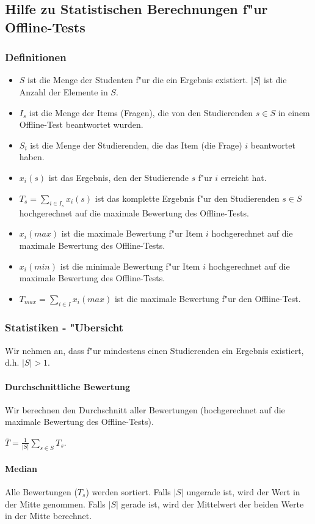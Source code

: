 \documentclass[12pt]{report}
\begin{document}
\subsection{Hilfe zu Statistischen Berechnungen f"ur Offline-Tests}
\subsubsection{Definitionen}
\begin{itemize}
\item $S$ ist die Menge der Studenten f"ur die ein Ergebnis existiert. $|S|$ ist die Anzahl der Elemente in $S$.
\item $I_s$ ist die Menge der Items (Fragen), die von den Studierenden $s\in S$ in einem Offline-Test beantwortet wurden.
\item $S_i$ ist die Menge der Studierenden, die das Item (die Frage) $i$ beantwortet haben.
\item $x_i(s)$ ist das Ergebnis, den der Studierende $s$ f"ur $i$ erreicht hat.
\item $T_s = \sum\limits_{i\in I_s} x_i(s)$ ist das komplette Ergebnis f"ur den Studierenden $s\in S$ hochgerechnet auf die maximale Bewertung des Offline-Tests.
\item $x_i(max)$ ist die maximale Bewertung f"ur Item $i$ hochgerechnet auf die maximale Bewertung des Offline-Tests. 
\item $x_i(min)$ ist die minimale Bewertung f"ur Item $i$ hochgerechnet auf die maximale Bewertung des Offline-Tests. 
\item $T_{max}=\sum\limits_{i\in I} x_i(max)$ ist die maximale Bewertung f"ur den Offline-Test.
\end{itemize}

\subsubsection{Statistiken - "Ubersicht}
Wir nehmen an, dass f"ur mindestens einen Studierenden ein Ergebnis existiert, d.h. $|S|>1$.

\paragraph{Durchschnittliche Bewertung}
Wir berechnen den Durchschnitt aller Bewertungen (hochgerechnet auf die maximale Bewertung des Offline-Tests).

$\bar{T}=\frac{1}{|S|}\sum\limits_{s\in S}T_s$.

\paragraph{Median}
Alle Bewertungen ($T_s$) werden sortiert. Falls $|S|$ ungerade ist, wird der Wert in der Mitte genommen. Falls $|S|$ gerade ist, wird der Mittelwert der beiden Werte in der Mitte berechnet. 
\end{document}
